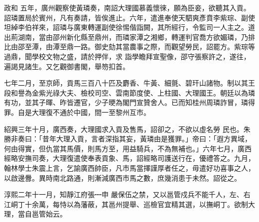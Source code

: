 \begin{pinyinscope}
 政和
 五年，廣州觀察使黃璘奏，南詔大理國慕義懷徠，願為臣妾，欲聽其入貢。詔璘置局於賓州，凡有奏請，皆俟進止。六年，遣進奉使天駟爽彥賁李紫琮、副使坦綽李伯祥來，詔璘与廣東轉運副使徐惕偕詣闕，其所經行，令監司一人主之。道出荊湖南，當由邵州新化縣至鼎州，而璘家潭之湘鄉，轉運判官喬方欲媚璘，乃排比由邵至潭，由潭至鼎一路。御史劾其當農事之際，而觀望勞民，詔罷方。紫琮等過鼎，聞學校文物之盛，請於押伴，求
 詣學瞻拜宣聖像，邵守張察許之，遂往，遍謁見諸生。又乞觀御書閣，舉笏扣首。



 七年二月，至京師，貢馬三百八十匹及麝香、牛黃、細氈、碧玕山諸物。制以其王段和譽為金紫光祿大夫、檢校司空、雲南節度使、上柱國、大理國王。朝廷以為璘有功，並其子暉、昨皆遷官，少子𣆳為閣門宣贊舍人。已而知桂州周璘詐冒，璘得罪。自是大理復不通於中國，間一至黎州互市。



 紹興三年十月，廣西奏，大理國求入貢及售馬，詔卻之，不欲以虛名勞
 民也。朱勝非奏曰：「昔年大理入貢，言者深指其妄，黃璘由是獲罪。」帝曰：「遐方異域，何由得實，但仇當其馬價，則馬方至，用益騎兵，不為無補也。」六年七月，廣西經略安撫司奏，大理復遣使奉表貢象、馬，詔經略司護送行在，優禮答之。九月，翰林學士朱震上言，乞諭廣西帥臣，凡市馬當擇謹厚者任之，毋遣好功喜事之人，以啟邊釁。異時南北路通，則漸減廣西市馬之數，庶幾消患于未然。詔從之。



 淳熙二年十一月，知靜江府張┉申
 嚴保伍之禁，又以邕管戍兵不能千人，左、右江峒丁十余萬，每恃以為藩蔽，其邕州提舉、巡檢官宜精其選，以撫峒丁。欲制大理，當自邕管始云。



\end{pinyinscope}